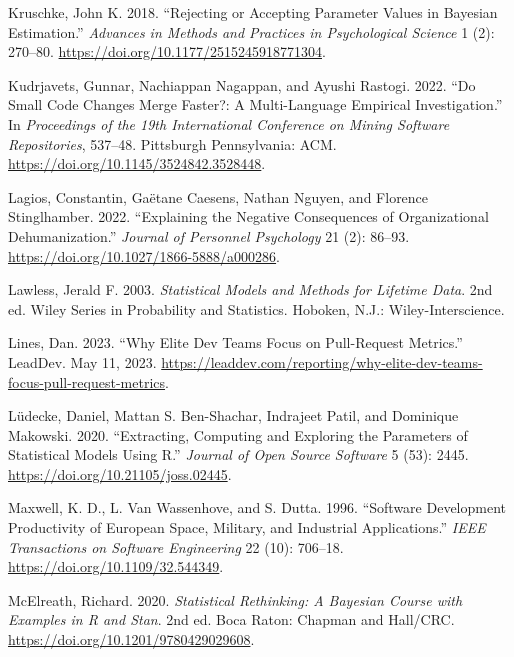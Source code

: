 \documentclass[
]{article}
\newlength{\cslhangindent}
\newenvironment{CSLReferences}[2] %
 {\begin{list}{}{%
  \setlength{\itemindent}{0pt}
  \setlength{\leftmargin}{0pt}
  \setlength{\parsep}{0pt}
  \ifodd #1
   \setlength{\leftmargin}{\cslhangindent}
   \setlength{\itemindent}{-1\cslhangindent}
  \fi
  \setlength{\itemsep}{#2\baselineskip}}}
 {\end{list}}
\begin{document}
\begin{CSLReferences}{1}{0}
Kruschke, John K. 2018. {``Rejecting or {Accepting Parameter Values} in
{Bayesian Estimation}.''} \emph{Advances in Methods and Practices in
Psychological Science} 1 (2): 270--80.
\url{https://doi.org/10.1177/2515245918771304}.

Kudrjavets, Gunnar, Nachiappan Nagappan, and Ayushi Rastogi. 2022. {``Do
Small Code Changes Merge Faster?: A Multi-Language Empirical
Investigation.''} In \emph{Proceedings of the 19th {International
Conference} on {Mining Software Repositories}}, 537--48. Pittsburgh
Pennsylvania: ACM. \url{https://doi.org/10.1145/3524842.3528448}.

Lagios, Constantin, Gaëtane Caesens, Nathan Nguyen, and Florence
Stinglhamber. 2022. {``Explaining the {Negative Consequences} of
{Organizational} {Dehumanization}.''} \emph{Journal of Personnel
Psychology} 21 (2): 86--93.
\url{https://doi.org/10.1027/1866-5888/a000286}.

Lawless, Jerald F. 2003. \emph{Statistical Models and Methods for
Lifetime Data}. 2nd ed. Wiley Series in Probability and Statistics.
Hoboken, N.J.: Wiley-Interscience.

Lines, Dan. 2023. {``Why Elite Dev Teams Focus on Pull-Request
Metrics.''} LeadDev. May 11, 2023.
\url{https://leaddev.com/reporting/why-elite-dev-teams-focus-pull-request-metrics}.

Lüdecke, Daniel, Mattan S. Ben-Shachar, Indrajeet Patil, and Dominique
Makowski. 2020. {``Extracting, Computing and Exploring the Parameters of
Statistical Models Using {R}.''} \emph{Journal of Open Source Software}
5 (53): 2445. \url{https://doi.org/10.21105/joss.02445}.

Maxwell, K. D., L. Van Wassenhove, and S. Dutta. 1996. {``Software
Development Productivity of {European} Space, Military, and Industrial
Applications.''} \emph{IEEE Transactions on Software Engineering} 22
(10): 706--18. \url{https://doi.org/10.1109/32.544349}.

McElreath, Richard. 2020. \emph{Statistical {Rethinking}: {A Bayesian
Course} with {Examples} in {R} and {Stan}}. 2nd ed. Boca Raton: {Chapman
and Hall/CRC}. \url{https://doi.org/10.1201/9780429029608}.


\end{CSLReferences}
\end{document}
